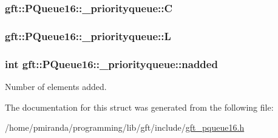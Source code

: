 \subsubsection[{\texorpdfstring{C}{C}}]{ gft\+::\+P\+Queue16\+::\+\_\+priorityqueue\+::C}\hypertarget{structgft_1_1PQueue16_1_1__priorityqueue_a3b00179eb83c3aceea4078e4b5e4fb53}{}\label{structgft_1_1PQueue16_1_1__priorityqueue_a3b00179eb83c3aceea4078e4b5e4fb53}
\subsubsection[{\texorpdfstring{L}{L}}]{ gft\+::\+P\+Queue16\+::\+\_\+priorityqueue\+::L}\hypertarget{structgft_1_1PQueue16_1_1__priorityqueue_a88a19657df74ff6d933e82ca2aacbb7e}{}\label{structgft_1_1PQueue16_1_1__priorityqueue_a88a19657df74ff6d933e82ca2aacbb7e}
\subsubsection[{\texorpdfstring{nadded}{nadded}}]{\setlength{\rightskip}{0pt plus 5cm}int gft\+::\+P\+Queue16\+::\+\_\+priorityqueue\+::nadded}\hypertarget{structgft_1_1PQueue16_1_1__priorityqueue_a1d36f79c71162c0d7c8cfb5cc9a56150}{}\label{structgft_1_1PQueue16_1_1__priorityqueue_a1d36f79c71162c0d7c8cfb5cc9a56150}


Number of elements added. 



The documentation for this struct was generated from the following file\+:\begin{DoxyCompactItemize}
\item 
/home/pmiranda/programming/lib/gft/include/\hyperlink{gft__pqueue16_8h}{gft\+\_\+pqueue16.\+h}\end{DoxyCompactItemize}
